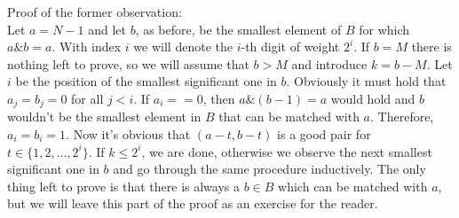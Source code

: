 \documentclass[a4paper]{article}
\begin{document}
Proof of the former observation:\\
Let $a = N - 1$ and let $b$, as before, be the smallest element of $B$ for which
$a \mathbin\& b = a$. With index $i$ we will denote the $i$-th digit of weight
$2^i$. If $b = M$ there is nothing left to prove, so we will assume that
$b > M$ and introduce $k = b - M$. Let $i$ be the position of the smallest
significant one in $b$. Obviously it must hold that $a_j = b_j = 0$ for all
$j < i$. If $a_i == 0$, then $a \mathbin\& (b - 1) = a$ would hold and $b$
wouldn't be the smallest element in $B$ that can be matched with $a$. Therefore,
$a_i = b_i = 1$. Now it's obvious that $(a - t, b - t)$ is a good pair for
$t \in \{1, 2, ..., 2^i\}$. If $k \leq 2^i$, we are done, otherwise we observe
the next smallest significant one in $b$ and go through the same procedure
inductively. The only thing left to prove is that there is always a $b \in B$
which can be matched with $a$, but we will leave this part of the proof as
an exercise for the reader.
\end{document}

